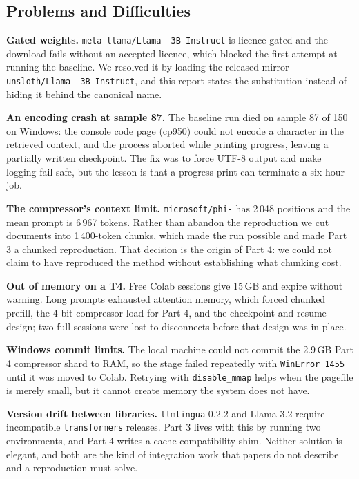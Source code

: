 ﻿\documentclass[10pt,a4paper,twocolumn]{article}
\newcommand{\LlamaGated}{\texttt{meta-llama/\allowbreak Llama-\allowbreak 3.2-\allowbreak 3B-\allowbreak Instruct}}
\newcommand{\LlamaMirror}{\texttt{unsloth/\allowbreak Llama-\allowbreak 3.2-\allowbreak 3B-\allowbreak Instruct}}
\newcommand{\PhiTwo}{\texttt{microsoft/\allowbreak phi-\allowbreak 2}}
\begin{document}
\subsection{Problems and Difficulties}
\label{sec:problems}

\textbf{Gated weights.} \LlamaGated{} is licence-gated
and the download fails without an accepted licence, which blocked the first
attempt at running the baseline. We resolved it by loading the released
mirror \LlamaMirror{}, and this report states the
substitution instead of hiding it behind the canonical name.

\textbf{An encoding crash at sample 87.} The baseline run died on sample 87 of
150 on Windows: the console code page (cp950) could not encode a character in the
retrieved context, and the process aborted while printing progress, leaving a
partially written checkpoint. The fix was to force UTF-8 output and make logging
fail-safe, but the lesson is that a progress print can terminate a six-hour job.

\textbf{The compressor's context limit.} \PhiTwo{} has 2\,048 positions and
the mean prompt is 6\,967 tokens. Rather than abandon the reproduction we cut
documents into 1\,400-token chunks, which made the run possible and made Part 3 a
chunked reproduction. That decision is the origin of Part 4: we could not claim to
have reproduced the method without establishing what chunking cost.

\textbf{Out of memory on a T4.} Free Colab sessions give 15\,GB and expire without
warning. Long prompts exhausted attention memory, which forced chunked prefill,
the 4-bit compressor load for Part 4, and the checkpoint-and-resume design; two
full sessions were lost to disconnects before that design was in place.

\textbf{Windows commit limits.} The local machine could not commit the 2.9\,GB
Part 4 compressor shard to RAM, so the stage failed repeatedly with
\texttt{WinError 1455} until it was moved to Colab. Retrying with
\texttt{disable\_mmap} helps when the pagefile is merely small, but it cannot
create memory the system does not have.

\textbf{Version drift between libraries.} \texttt{llmlingua} 0.2.2 and Llama 3.2
require incompatible \texttt{transformers} releases. Part 3 lives with this by
running two environments, and Part 4 writes a cache-compatibility shim. Neither
solution is elegant, and both are the kind of integration work that papers do not
describe and a reproduction must solve.
\end{document}
